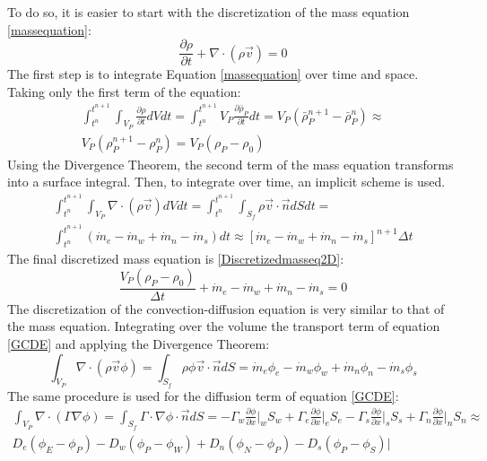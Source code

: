 To do so, it is easier to start with the discretization of the mass equation \ref{massequation}:
\begin{equation}
\frac{\partial\rho}{\partial t}+\nabla\cdot\left(\rho\vec{v}\right)=0
\label{massequation}
\end{equation}
The first step is to integrate Equation \ref{massequation} over time and space. Taking only the first term of the equation:
\begin{multline}
\int_{t^{n}}^{t^{n+1}}\int_{V_{P}}^{}\frac{\partial\rho}{\partial t}dVdt=\int_{t^{n}}^{t^{n+1}}V_{P}\frac{\partial\bar{\rho}_{P}}{\partial t}dt=V_{P}\left(\bar{\rho}_{P}^{n+1}-\bar{\rho}_{P}^{n}\right)\approx \\
V_{P}\left(\rho_{P}^{n+1}-\rho_{P}^{n}\right)=V_{P}\left(\rho_{P}-\rho_{0}\right)
\end{multline}
Using the Divergence Theorem, the second term of the mass equation transforms into a surface integral. Then, to integrate over time, an implicit scheme is used.
\begin{multline}
\int_{t^{n}}^{t^{n+1}}\int_{V_{P}}^{}\nabla\cdot\left(\rho\vec{v}\right)dVdt=\int_{t^{n}}^{t^{n+1}}\int_{S_{f}}^{}\rho\vec{v}\cdot\vec{n}dSdt= \\
\int_{t^{n}}^{t^{n+1}}\left(\dot{m}_{e}-\dot{m}_{w}+\dot{m}_{n}-\dot{m}_{s}\right)dt\approx\left[\dot{m}_{e}-\dot{m}_{w}+\dot{m}_{n}-\dot{m}_{s}\right]^{n+1}\Delta t
\end{multline}
The final discretized mass equation is \ref{Discretizedmasseq2D}:
\begin{equation}
\frac{V_{P}\left(\rho_{P}-\rho_{0}\right)}{\Delta t}+\dot{m}_{e}-\dot{m}_{w}+\dot{m}_{n}-\dot{m}_{s}=0
\label{Discretizedmasseq2D}
\end{equation}
The discretization of the convection-diffusion equation is very similar to that of the mass equation. Integrating over the volume the transport term of equation \ref{GCDE} and applying the Divergence Theorem:
\begin{equation}
\int_{V_{P}}\nabla\cdot\left(\rho\vec{v}\phi\right)=\int_{S_{f}}\rho\phi\vec{v}\cdot\vec{n}dS=\dot{m}_{e}\phi_{e}-\dot{m}_{w}\phi_{w}+\dot{m}_{n}\phi_{n}-\dot{m}_{s}\phi_{s}
\end{equation}
The same procedure is used for the diffusion term of equation \ref{GCDE}:
\begin{multline}
\int_{V_{P}}\nabla\cdot\left(\Gamma\nabla\phi\right)=\int_{S_{f}}\Gamma\cdot\nabla\phi\cdot\vec{n}dS=-\Gamma_{w}\frac{\partial\phi}{\partial x}\big|_{w}S_{w}+\Gamma_{e}\frac{\partial\phi}{\partial x}\big|_{e}S_{e}-\Gamma_{s}\frac{\partial\phi}{\partial x}\big|_{s}S_{s}+\Gamma_{n}\frac{\partial\phi}{\partial x}\big|_{n}S_{n}\approx \\
D_{e}\left(\phi_{E}-\phi_{P}\right)-D_{w}\left(\phi_{P}-\phi_{W}\right)+D_{n}\left(\phi_{N}-\phi_{P}\right)-D_{s}\left(\phi_{P}-\phi_{S}\right)\big|
\end{multline}
